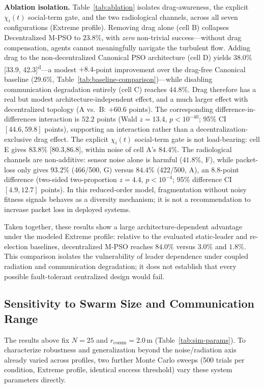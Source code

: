 \documentclass[conference]{IEEEtran}
\begin{document}
\textbf{Ablation isolation.} Table~\ref{tab:ablation} isolates drag-awareness, the explicit $\chi_i(t)$ social-term gate, and the two radiological channels, across all seven configurations (Extreme profile). Removing drag alone (cell B) collapses Decentralized M-PSO to $23.8\%$, with \emph{zero} non-trivial success---without drag compensation, agents cannot meaningfully navigate the turbulent flow. Adding drag to the non-decentralized Canonical PSO architecture (cell D) yields $38.0\%$ [33.9, 42.3]\textsuperscript{d}---a modest $+8.4$-point improvement over the drag-free Canonical baseline ($29.6\%$, Table~\ref{tab:baseline-comparison})---while disabling communication degradation entirely (cell C) reaches $44.8\%$. Drag therefore has a real but modest architecture-independent effect, and a much larger effect with decentralized topology (A vs.\ B: $+60.6$ points). The corresponding difference-in-differences interaction is $52.2$ points (Wald $z=13.4$, $p<10^{-40}$; 95\% CI $[44.6,59.8]$ points), supporting an interaction rather than a decentralization-exclusive drag effect. The explicit $\chi_i(t)$ social-term gate is not load-bearing: cell E gives $83.8\%$ [80.3,86.8], within noise of cell A's $84.4\%$. The radiological channels are non-additive: sensor noise alone is harmful ($41.8\%$, F), while packet-loss only gives $93.2\%$ (466/500, G) versus $84.4\%$ (422/500, A), an $8.8$-point difference (two-sided two-proportion $z=4.4$, $p<10^{-4}$; 95\% difference CI $[4.9,12.7]$ points). In this reduced-order model, fragmentation without noisy fitness signals behaves as a diversity mechanism; it is not a recommendation to increase packet loss in deployed systems.

Taken together, these results show a large architecture-dependent advantage under the modeled Extreme profile: relative to the evaluated static-leader and re-election baselines, decentralized M-PSO reaches $84.0\%$ versus $3.0\%$ and $1.8\%$. This comparison isolates the vulnerability of leader dependence under coupled radiation and communication degradation; it does not establish that every possible fault-tolerant centralized design would fail.

\subsection{Sensitivity to Swarm Size and Communication Range}
\label{sec:sensitivity}

The results above fix $N=25$ and $r_{\text{comm}}=2.0\,\text{m}$ (Table~\ref{tab:sim-params}). To characterize robustness and generalization beyond the noise/radiation axis already varied across profiles, two further Monte Carlo sweeps (500 trials per condition, Extreme profile, identical success threshold) vary these system parameters directly.
\end{document}
